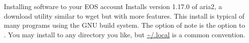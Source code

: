 \begin{block}{Installing software to your EOS account}
  Installs version 1.17.0 of aria2, a download utility similar to wget but with more features. This install is typical of many programs using the GNU build system. The option of note is the  option to . You may install to any directory you like, but \url{\~/.local} is a common convention. \\
  \begin{indented}
    {\scriptsize \inputminted[tabsize=2,frame=single]{bash}{../common/install_aria2.bash}}
  \end{indented}
\end{block}
